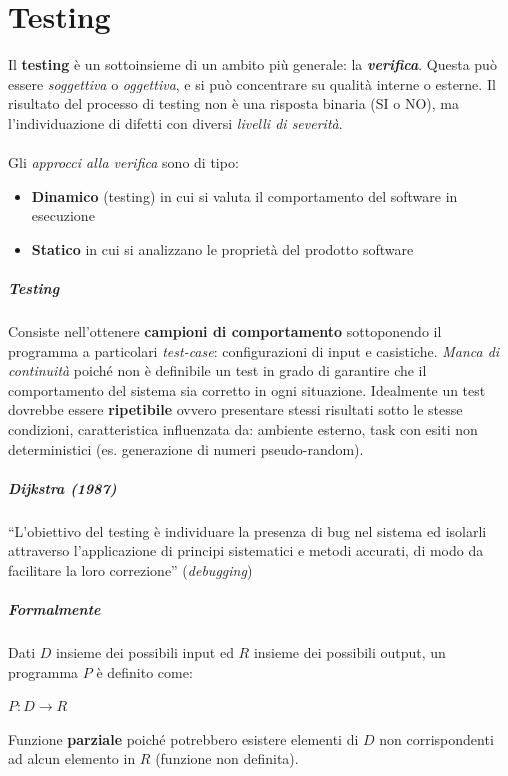 \chapter{Testing}

Il \textbf{testing} è un sottoinsieme di un ambito più generale: la \textbf{\textit{verifica}}.
Questa può essere \textit{soggettiva} o \textit{oggettiva}, e si può concentrare su qualità interne o esterne. Il risultato del processo di testing non è una risposta binaria (SI o NO), ma l'individuazione di difetti con diversi \textit{livelli di severità}.
\\
\\
Gli \textit{approcci alla verifica} sono di tipo:
\begin{itemize}
    \item \textbf{Dinamico} (testing) in cui si valuta il comportamento del software in esecuzione
    \item \textbf{Statico} in cui si analizzano le proprietà del prodotto software
\end{itemize}

\paragraph{Testing} Consiste nell'ottenere \textbf{campioni di comportamento} sottoponendo il programma a particolari \textit{test-case}: configurazioni di input e casistiche. \textit{Manca di continuità} poiché non è definibile un test in grado di garantire che il comportamento del sistema sia corretto in ogni situazione. Idealmente un test dovrebbe essere \textbf{ripetibile} ovvero presentare stessi risultati sotto le stesse condizioni, caratteristica influenzata da: ambiente esterno, task con esiti non deterministici (es. generazione di numeri pseudo-random).

\paragraph{Dijkstra (1987)} “L'obiettivo del testing è individuare la presenza di bug nel sistema ed isolarli attraverso l'applicazione di principi sistematici e metodi accurati, di modo da facilitare la loro correzione” (\textit{debugging})

\paragraph{Formalmente} Dati $D$ insieme dei possibili input ed $R$ insieme dei possibili output, un programma $P$ è definito come:
\begin{center}
    $P : D \rightarrow R$
\end{center}
Funzione \textbf{parziale} poiché potrebbero esistere elementi di $D$ non corrispondenti ad alcun elemento in $R$ (funzione non definita).

